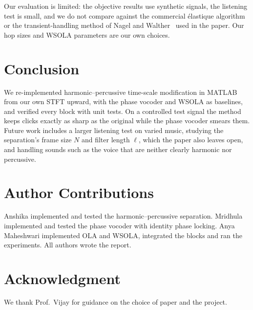 \documentclass[conference]{IEEEtran}
\begin{document}
Our evaluation is limited: the objective results use synthetic signals, the listening test is small, and we do not compare against the commercial \'elastique algorithm or the transient-handling method of Nagel and Walther~\cite{nagel09} used in the paper. Our hop sizes and WSOLA parameters are our own choices.

\section{Conclusion}
We re-implemented harmonic--percussive time-scale modification in MATLAB from our own STFT upward, with the phase vocoder and WSOLA as baselines, and verified every block with unit tests. On a controlled test signal the method keeps clicks exactly as sharp as the original while the phase vocoder smears them. Future work includes a larger listening test on varied music, studying the separation's frame size $N$ and filter length $\ell$, which the paper also leaves open, and handling sounds such as the voice that are neither clearly harmonic nor percussive.

\section*{Author Contributions}
Anshika implemented and tested the harmonic--percussive separation. Mridhula implemented and tested the phase vocoder with identity phase locking. Anya Maheshwari implemented OLA and WSOLA, integrated the blocks and ran the experiments. All authors wrote the report.

\section*{Acknowledgment}
We thank Prof.~Vijay for guidance on the choice of paper and the project.
\end{document}
